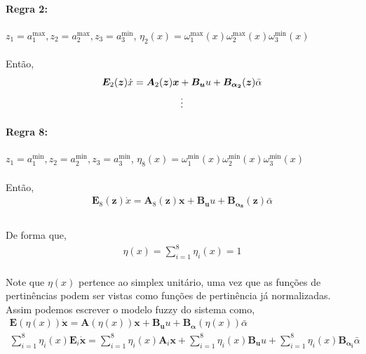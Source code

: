 \documentclass[a4paper,10pt]{article}
\begin{document}
\paragraph{Regra 2:} $z_1 = a_1^{\max}, z_2 = a_2^{\max}, z_3 = a_3^{\min}$, $\eta_2(x) = \omega_{1}^{\max}(x)\omega_{2}^{\max}(x)\omega_{3}^{\min}(x) $
\paragraph{}Então, 
\begin{gather}
	\bm{E}_2(\bm{z})\dot{x} = \bm{A}_2(\bm{z})\bm{x} + \bm{B_u}u + \bm{B_{\alpha_{2}}}(\bm{z})\bar{\alpha} \\
	\centering{\vdots}
\end{gather} 
\paragraph{Regra 8:} $z_1 = a_1^{\min}, z_2 = a_2^{\min}, z_3 = a_3^{\min}$, $\eta_8(x) = \omega_{1}^{\min}(x)\omega_{2}^{\min}(x)\omega_{3}^{\min}(x) $
\paragraph{}Então,
\begin{gather}
	\bm{E}_8(\bm{z})\dot{x} = \bm{A}_8(\bm{z})\bm{x} + \bm{B_u}u + \bm{B_{\alpha_{8}}}(\bm{z})\bar{\alpha} \\
\end{gather} 
\paragraph{}De forma que,
\begin{gather}
	\eta(x) = \sum_{i=1}^{8}\eta_i(x) = 1
\end{gather}
\paragraph{}Note que $\eta(x)$ pertence ao simplex unitário, uma vez que as funções de pertinências podem ser vistas como funções de pertinência já normalizadas. Assim podemos escrever o modelo fuzzy do sistema como,
\begin{gather}
\bm{E}(\eta(x))\dot{\bm{x}} = \bm{A}(\eta(x))\bm{x} + \bm{B_u}u + \bm{B_{\alpha}}(\eta(x))\bar{\alpha} \\
\boxed{\sum_{i=1}^{8}\eta_i(x)\bm{E}_i\dot{\bm{x}} = \sum_{i=1}^{8}\eta_i(x)\bm{A}_{i}\bm{x} + \sum_{i=1}^{8}\eta_i(x)\bm{B_u}u + \sum_{i=1}^{8}\eta_i(x)\bm{B_{\alpha_{i}}}\bar{\alpha}}
\end{gather}
\end{document}
